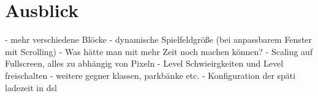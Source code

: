 \section{Ausblick}

- mehr verschiedene Blöcke
- dynamische Spielfeldgröße (bei anpassbarem Fenster mit Scrolling)
- Was hätte man mit mehr Zeit noch machen können?
- Scaling auf Fullscreen, alles zu abhängig von Pixeln
- Level Schwieirgkeiten und Level freischalten
- weitere gegner klassen, parkbänke etc.
- Konfiguration der späti ladezeit in dsl